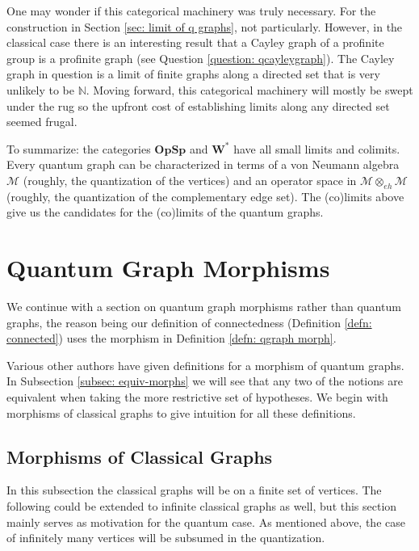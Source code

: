 \documentclass[12pt]{article}
\theoremstyle{definition}
\newenvironment{remark}
  {\pushQED{\qed}\renewcommand{\qedsymbol}{\textcircled{\tiny R}}\remarkx}
  {\popQED\endremarkx}
\newcommand{\N}{\mathbb N}
\newcommand{\mc}[1]{\mathcal{#1}}
\newcommand{\<}{\langle}
\renewcommand{\>}{\rangle}
\newcommand{\eh}{\otimes_{eh}}
\begin{document}
\begin{remark}
One may wonder if this categorical machinery was truly necessary. For the construction in Section \ref{sec: limit of q graphs}, not particularly. However, in the classical case there is an interesting result that a Cayley graph of a profinite group is a profinite graph (see Question \ref{question: qcayleygraph}). The Cayley graph in question is a limit of finite graphs along a directed set that is very unlikely to be $\N$. Moving forward, this categorical machinery will mostly be swept under the rug so the upfront cost of establishing limits along any directed set seemed frugal. 
\end{remark}

To summarize: the categories $\textbf{OpSp}$ and $\mathbf{W^*}$ have all small limits and colimits. Every quantum graph can be characterized in terms of a von Neumann algebra $\mc M$ (roughly, the quantization of the vertices) and an operator space in $\mc M \eh \mc M$ (roughly, the quantization of the complementary edge set). The (co)limits above give us the candidates for the (co)limits of the quantum graphs.


\section{Quantum Graph Morphisms} \label{sec: morphisms}

We continue with a section on quantum graph morphisms rather than quantum graphs, the reason being our definition of connectedness (Definition \ref{defn: connected}) uses the morphism in Definition \ref{defn: qgraph morph}.

Various other authors have given definitions for a morphism of quantum graphs. In Subsection \ref{subsec: equiv-morphs} we will see that any two of the notions are equivalent when taking the more restrictive set of hypotheses. We begin with morphisms of classical graphs to give intuition for all these definitions.

\subsection{Morphisms of Classical Graphs} \label{subsec: classical graph morphisms}
In this subsection the classical graphs will be on a finite set of vertices. The following could be extended to infinite classical graphs as well, but this section mainly serves as motivation for the quantum case. As mentioned above, the case of infinitely many vertices will be subsumed in the quantization.
\end{document}
